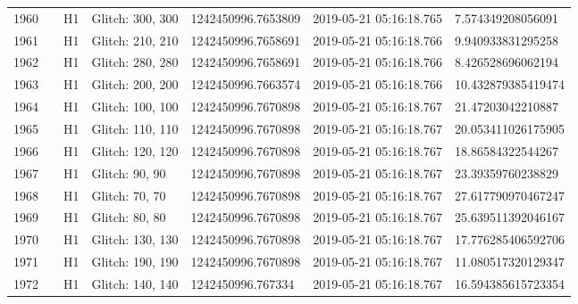 \begin{longtable}{lllllll}
1960 &                                                    &       H1 &  Glitch: 300, 300 &  1242450996.7653809 &  2019-05-21 05:16:18.765 &   7.574349208056091 \\
1961 &                                                    &       H1 &  Glitch: 210, 210 &  1242450996.7658691 &  2019-05-21 05:16:18.766 &   9.940933831295258 \\
1962 &                                                    &       H1 &  Glitch: 280, 280 &  1242450996.7658691 &  2019-05-21 05:16:18.766 &   8.426528696062194 \\
1963 &                                                    &       H1 &  Glitch: 200, 200 &  1242450996.7663574 &  2019-05-21 05:16:18.766 &  10.432879385419474 \\
1964 &                                                    &       H1 &  Glitch: 100, 100 &  1242450996.7670898 &  2019-05-21 05:16:18.767 &   21.47203042210887 \\
1965 &                                                    &       H1 &  Glitch: 110, 110 &  1242450996.7670898 &  2019-05-21 05:16:18.767 &  20.053411026175905 \\
1966 &                                                    &       H1 &  Glitch: 120, 120 &  1242450996.7670898 &  2019-05-21 05:16:18.767 &   18.86584322544267 \\
1967 &                                                    &       H1 &    Glitch: 90, 90 &  1242450996.7670898 &  2019-05-21 05:16:18.767 &   23.39359760238829 \\
1968 &                                                    &       H1 &    Glitch: 70, 70 &  1242450996.7670898 &  2019-05-21 05:16:18.767 &  27.617790970467247 \\
1969 &                                                    &       H1 &    Glitch: 80, 80 &  1242450996.7670898 &  2019-05-21 05:16:18.767 &  25.639511392046167 \\
1970 &                                                    &       H1 &  Glitch: 130, 130 &  1242450996.7670898 &  2019-05-21 05:16:18.767 &  17.776285406592706 \\
1971 &                                                    &       H1 &  Glitch: 190, 190 &  1242450996.7670898 &  2019-05-21 05:16:18.767 &  11.080517320129347 \\
1972 &                                                    &       H1 &  Glitch: 140, 140 &   1242450996.767334 &  2019-05-21 05:16:18.767 &  16.594385615723354 \\

\end{longtable}
